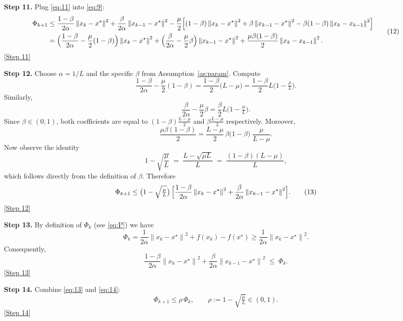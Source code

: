 \documentclass{article}
\newcommand{\norm}[1]{\left\lVert#1\right\rVert}
\begin{document}
\medskip
\noindent\textbf{Step 11.} Plug \eqref{eq:11} into \eqref{eq:9}:
\[
\begin{aligned}
\Phi_{k+1}
&\le \frac{1-\beta}{2\alpha}\norm{x_{k}-x^{\star}}^{2}
   +\frac{\beta}{2\alpha}\norm{x_{k-1}-x^{\star}}^{2}
   -\frac{\mu}{2}\Bigl[(1-\beta)\norm{x_{k}-x^{\star}}^{2}
                     +\beta \norm{x_{k-1}-x^{\star}}^{2}
                     -\beta(1-\beta)\norm{x_{k}-x_{k-1}}^{2}\Bigr] \\
&= \Bigl(\frac{1-\beta}{2\alpha}-\frac{\mu}{2}(1-\beta)\Bigr)\norm{x_{k}-x^{\star}}^{2}
   +\Bigl(\frac{\beta}{2\alpha}-\frac{\mu}{2}\beta\Bigr)\norm{x_{k-1}-x^{\star}}^{2}
   +\frac{\mu\beta(1-\beta)}{2}\norm{x_{k}-x_{k-1}}^{2}.
\end{aligned}
\tag{12}
\]
\noindent\underline{[Step 11]}

\medskip
\noindent\textbf{Step 12.} Choose $\alpha=1/L$ and the specific $\beta$ from Assumption~\ref{as:param}. Compute
\[
\frac{1-\beta}{2\alpha}-\frac{\mu}{2}(1-\beta)
   =\frac{1-\beta}{2}\bigl(L-\mu\bigr)
   =\frac{1-\beta}{2}L\bigl(1-\tfrac{\mu}{L}\bigr).
\]
Similarly,
\[
\frac{\beta}{2\alpha}-\frac{\mu}{2}\beta
   =\frac{\beta}{2}L\bigl(1-\tfrac{\mu}{L}\bigr).
\]
Since $\beta\in(0,1)$, both coefficients are equal to $(1-\beta) \tfrac{L-\mu}{2}$ and $\beta \tfrac{L-\mu}{2}$ respectively. Moreover,
\[
\frac{\mu\beta(1-\beta)}{2}
   =\frac{L-\mu}{2}\,\beta\bigl(1-\beta\bigr)\;\frac{\mu}{L-\mu}.
\]
Now observe the identity
\[
1-\sqrt{\frac{\mu}{L}}
   \;=\; \frac{L-\sqrt{\mu L}}{L}
   \;=\; \frac{(1-\beta)(L-\mu)}{L},
\]
which follows directly from the definition of $\beta$.
Therefore
\[
\Phi_{k+1}\le \bigl(1-\sqrt{\tfrac{\mu}{L}}\bigr)\,
            \Bigl[\frac{1-\beta}{2\alpha}\norm{x_{k}-x^{\star}}^{2}
                +\frac{\beta}{2\alpha}\norm{x_{k-1}-x^{\star}}^{2}\Bigr].
\tag{13}
\]
\noindent\underline{[Step 12]}

\medskip
\noindent\textbf{Step 13.} By definition of $\Phi_{k}$ (see \eqref{eq:P}) we have
\[
\Phi_{k}= \frac{1}{2\alpha}\norm{x_{k}-x^{\star}}^{2}+f(x_{k})-f(x^{\star})
        \ge \frac{1}{2\alpha}\norm{x_{k}-x^{\star}}^{2}.
\]
Consequently,
\[
\frac{1-\beta}{2\alpha}\norm{x_{k}-x^{\star}}^{2}
   +\frac{\beta}{2\alpha}\norm{x_{k-1}-x^{\star}}^{2}
   \;\le\; \Phi_{k}.
\tag{14}
\]
\noindent\underline{[Step 13]}

\medskip
\noindent\textbf{Step 14.} Combine \eqref{eq:13} and \eqref{eq:14}:
\[
\Phi_{k+1}\le \rho\,\Phi_{k},
\qquad \rho:=1-\sqrt{\tfrac{\mu}{L}}\in(0,1).
\tag{15}
\]
\noindent\underline{[Step 14]}
\end{document}

